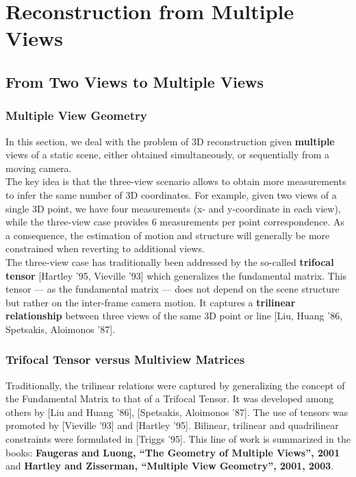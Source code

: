 \section{Reconstruction from Multiple Views}%
\label{sec:reconstruction_from_multiple_views}


\subsection{From Two Views to Multiple Views}%
\label{sub:from_two_views_to_multiple_views}


\subsubsection*{Multiple View Geometry}%
\label{ssub:multiple_view_geometry}


In this section, we deal with the problem of 3D reconstruction
given \textbf{multiple} views of a static scene, either obtained simultaneously,
or sequentially from a moving camera.\\

The key idea is that the three-view scenario allows to obtain more measurements
to infer the same number of 3D coordinates.
For example, given two views of a single 3D point, we have four measurements
(x- and y-coordinate in each view), while the three-view case provides
6 measurements per point correspondence.
As a consequence, the estimation of motion and structure will generally
be more constrained when reverting to additional views.\\

The three-view case has traditionally been addressed by the so-called
\textbf{trifocal tensor} [Hartley '95, Vieville '93]
which generalizes the fundamental matrix.
This tensor --- as the fundamental matrix --- does not depend on the scene
structure but rather on the inter-frame camera motion.
It captures a \textbf{trilinear relationship} between three views of
the same 3D point or line [Liu, Huang '86, Spetsakis, Aloimonos '87].


\subsubsection*{Trifocal Tensor versus Multiview Matrices}%
\label{ssub:trifocal_tensor_versus_multiview_matrices}


Traditionally, the trilinear relations were captured by generalizing
the concept of the Fundamental Matrix to that of a Trifocal Tensor.
It was developed among others by [Liu and Huang '86], [Spetsakis, Aloimonos '87].
The use of tensors was promoted by [Vieville '93] and [Hartley '95].
Bilinear, trilinear and quadrilinear constraints were formulated
in [Triggs '95]. This line of work is summarized in the books:
\textbf{Faugeras and Luong, ``The Geometry of Multiple Views'', 2001} and
\textbf{Hartley and Zisserman, ``Multiple View Geometry'', 2001, 2003}.\\

